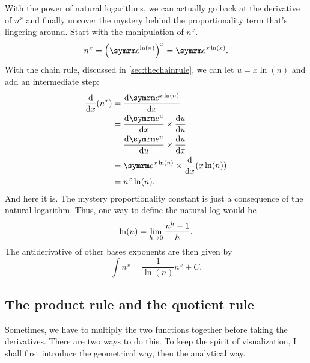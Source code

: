 With the power of natural logarithms, we can actually go back at the derivative of $n^x$ and finally uncover the mystery behind the proportionality term that's lingering around. Start with the manipulation of $n^x$.
\begin{equation}
    n^x = \left(\e^{\ln(n)}\right)^x = \e^{x\ln(x)}.
\end{equation}
With the chain rule, discussed in \cref{sec:thechainrule}, we can let $u = x\ln(n)$ and add an intermediate step:
\begin{align*}
    \dv{x}(n^x) &= \dv{\e^{x\ln(n)}}{x} \\
    &= \dv{\e^u}{x} \times \dv{u}{u} \\
    &= \dv{\e^u}{u} \times \dv{u}{x} \\
    &= \e^{x\ln(n)} \times \dv{x}(x\ln(n)) \\
    &= n^x\ln(n).
\end{align*}
And here it is. The mystery proportionality constant is just a consequence of the natural logarithm. Thus, one way to define the natural log would be
\begin{equation}
    \ln(n) = \lim_{h \rightarrow 0}\frac{n^h - 1}{h}.
\end{equation}
The antiderivative of other bases exponents are then given by
\begin{equation}
    \int n^x = \frac{1}{\ln(n)}n^x + C.
\end{equation}

\subsection{The product rule and the quotient rule}

Sometimes, we have to multiply the two functions together before taking the derivatives. There are two ways to do this. To keep the spirit of visualization, I shall first introduce the geometrical way, then the analytical way.

